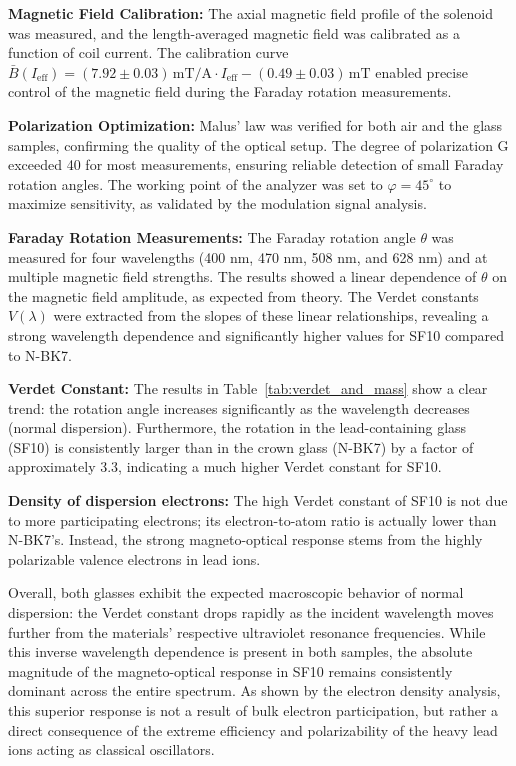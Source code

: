 \documentclass[a4paper]{article}
\begin{document}
\textbf{Magnetic Field Calibration:}
The axial magnetic field profile of the solenoid was measured, and the length-averaged magnetic field was calibrated as a function of coil current. The calibration curve $\bar{B}(I_{\text{eff}}) = (7.92 \pm 0.03)\,\text{mT/A} \cdot I_{\text{eff}} - (0.49 \pm 0.03)\,\text{mT}$ enabled precise control of the magnetic field during the Faraday rotation measurements.

\textbf{Polarization Optimization:}
Malus' law was verified for both air and the glass samples, confirming the quality of the optical setup. The degree of polarization G exceeded 40 for most measurements, ensuring reliable detection of small Faraday rotation angles. The working point of the analyzer was set to $\varphi = 45^\circ$ to maximize sensitivity, as validated by the modulation signal analysis.

\textbf{Faraday Rotation Measurements:}
The Faraday rotation angle $\theta$ was measured for four wavelengths (400 nm, 470 nm, 508 nm, and 628 nm) and at multiple magnetic field strengths. The results showed a linear dependence of $\theta$ on the magnetic field amplitude, as expected from theory. The Verdet constants $V(\lambda)$ were extracted from the slopes of these linear relationships, revealing a strong wavelength dependence and significantly higher values for SF10 compared to N-BK7.

\textbf{Verdet Constant:}
The results in Table~\ref{tab:verdet_and_mass} show a clear trend: the rotation angle increases significantly as the wavelength decreases (normal dispersion). Furthermore, the rotation in the lead-containing glass (SF10) is consistently larger than in the crown glass (N-BK7) by a factor of approximately 3.3, indicating a much higher Verdet constant for SF10.

\textbf{Density of dispersion electrons:}
The high Verdet constant of SF10 is not due to more participating electrons; its electron-to-atom ratio is actually lower than N-BK7's. Instead, the strong magneto-optical response stems from the highly polarizable valence electrons in lead ions.

Overall, both glasses exhibit the expected macroscopic behavior of normal dispersion: the Verdet constant drops rapidly as the incident wavelength moves further from the materials' respective ultraviolet resonance frequencies. While this inverse wavelength dependence is present in both samples, the absolute magnitude of the magneto-optical response in SF10 remains consistently dominant across the entire spectrum. As shown by the electron density analysis, this superior response is not a result of bulk electron participation, but rather a direct consequence of the extreme efficiency and polarizability of the heavy lead ions acting as classical oscillators.
\end{document}
